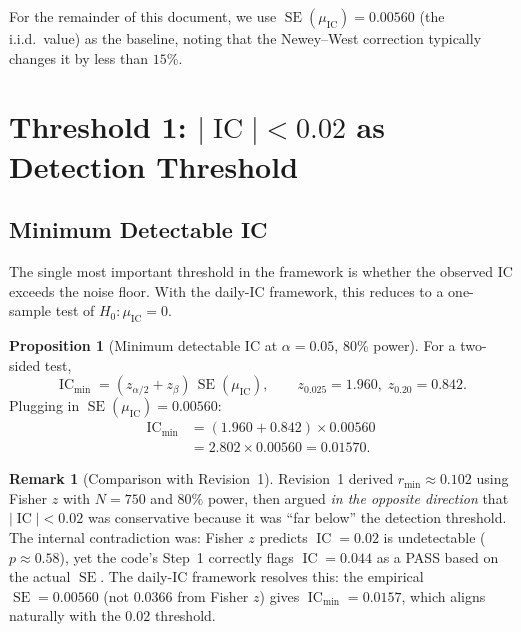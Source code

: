 \documentclass[11pt,a4paper]{article}
\theoremstyle{definition}
\newtheorem{proposition}{Proposition}[section]
\newtheorem{remark}{Remark}[section]
\newcommand{\IC}{\operatorname{IC}}
\newcommand{\SE}{\operatorname{SE}}
\newcommand{\Ho}{H_{0}}
\begin{document}
For the remainder of this document, we use $\SE(\mu_{\IC}) = 0.00560$
(the i.i.d.\ value) as the baseline, noting that the Newey--West
correction typically changes it by less than $15\%$.

\section{Threshold 1: \texorpdfstring{$|\IC| < 0.02$}{IC < 0.02} as
Detection Threshold}
\label{sec:thresh1}

\subsection{Minimum Detectable IC}

The single most important threshold in the framework is whether the
observed IC exceeds the noise floor. With the daily-IC framework,
this reduces to a one-sample test of $\Ho: \mu_{\IC}=0$.

\begin{proposition}[Minimum detectable IC at $\alpha=0.05$, 80\% power]
For a two-sided test,
\begin{equation}
    \IC_{\min} = (z_{\alpha/2} + z_{\beta})\,\SE(\mu_{\IC}),
    \qquad
    z_{0.025}=1.960,\; z_{0.20}=0.842.
    \label{eq:ic_min}
\end{equation}
Plugging in $\SE(\mu_{\IC})=0.00560$:
\begin{align}
    \IC_{\min} &= (1.960 + 0.842) \times 0.00560 \nonumber \\
               &= 2.802 \times 0.00560 = \mathbf{0.01570}.
    \label{eq:ic_min_value}
\end{align}
\end{proposition}

\begin{remark}[Comparison with Revision~1]
Revision~1 derived $r_{\min} \approx 0.102$ using Fisher $z$ with
$N=750$ and $80\%$ power, then argued \emph{in the opposite direction}
that $|\IC|<0.02$ was conservative because it was ``far below'' the
detection threshold. The internal contradiction was: Fisher $z$
predicts $\IC=0.02$ is undetectable ($p \approx 0.58$), yet the
code's Step~1 correctly flags $\IC=0.044$ as a PASS based on the
actual $\SE$. The daily-IC framework resolves this: the empirical
$\SE=0.00560$ (not $0.0366$ from Fisher $z$) gives $\IC_{\min}=0.0157$,
which aligns naturally with the $0.02$ threshold.
\end{remark}
\end{document}
